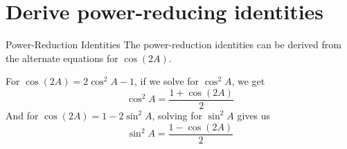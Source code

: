 \documentclass[t,usenames,dvipsnames]{beamer}
\begin{document}
\section{Derive power-reducing identities}

\begin{frame}{Power-Reduction Identities}
    The power-reduction identities can be derived from the alternate equations for $\cos(2A)$.   \newline\\  \pause
    
    For $\cos(2A) = 2\cos^2A - 1$, if we solve for $\cos^2 A$, we get
    \[
    \cos^2 A = \frac{1+\cos(2A)}{2}
    \]
    \pause
    And for $\cos(2A) = 1 - 2\sin^2 A$, solving for $\sin^2 A$ gives us
    \[
    \sin^2 A = \frac{1-\cos(2A)}{2}
    \]
\end{frame}
\end{document}
